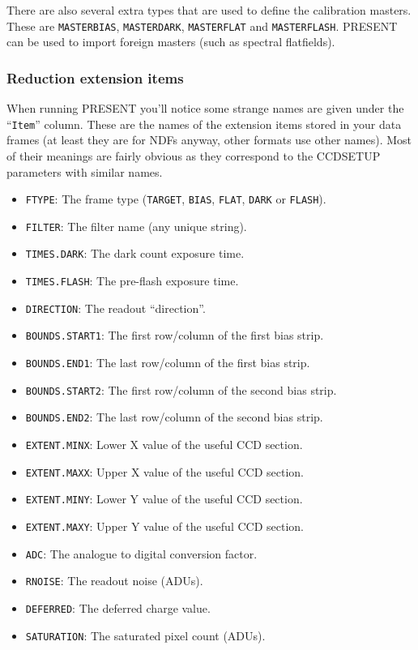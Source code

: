 \documentclass[twoside,11pt]{article}
\newcommand{\htmlref}[2]{#1}
\newcommand{\xlabel}[1]{}
\renewcommand{\_}{\texttt{\symbol{95}}}
\newcommand{\text}[1]{{\small \tt #1}}
\newcommand{\routine}[1]{{\sc #1}}
\newcommand{\xroutine}[1]{\htmlref{{\sc #1}}{#1}}
\begin{document}
There are also several extra types that are used to define the
calibration masters. These are \text{MASTER\_BIAS},
\text{MASTER\_DARK}, \text{MASTER\_FLAT} and \text{MASTER\_FLASH}.
\routine{PRESENT} can be used to import foreign masters (such as
spectral flatfields).


\subsubsection{Reduction extension items \xlabel{reductionitems}}
When running \xroutine{PRESENT} you'll notice some strange names are
given under the ``\text{Item}'' column. These are the names of the
extension items stored in your data frames (at least they are for NDFs
anyway, other formats use other names). Most of their meanings are
fairly obvious as they correspond to the \xroutine{CCDSETUP}
parameters with similar names.
\begin{itemize}
\item \text{FTYPE}: The frame type (\text{TARGET}, \text{BIAS},
\text{FLAT}, \text{DARK} or \text{FLASH}).
\item \text{FILTER}: The filter name (any unique string).
\item \text{TIMES.DARK}: The dark count exposure time.
\item \text{TIMES.FLASH}: The pre-flash exposure time.
\item \text{DIRECTION}: The readout ``direction''.
\item \text{BOUNDS.START1}: The first row/column of the first bias strip.
\item \text{BOUNDS.END1}: The last row/column of the first bias strip.
\item \text{BOUNDS.START2}: The first row/column of the second bias strip.
\item \text{BOUNDS.END2}: The last row/column of the second bias strip.
\item \text{EXTENT.MINX}: Lower X value of the useful CCD section.
\item \text{EXTENT.MAXX}: Upper X value of the useful CCD section.
\item \text{EXTENT.MINY}: Lower Y value of the useful CCD section.
\item \text{EXTENT.MAXY}: Upper Y value of the useful CCD section.
\item \text{ADC}: The analogue to digital conversion factor.
\item \text{RNOISE}: The readout noise (ADUs).
\item \text{DEFERRED}: The deferred charge value.
\item \text{SATURATION}: The saturated pixel count (ADUs).
\end{itemize}
\end{document}
